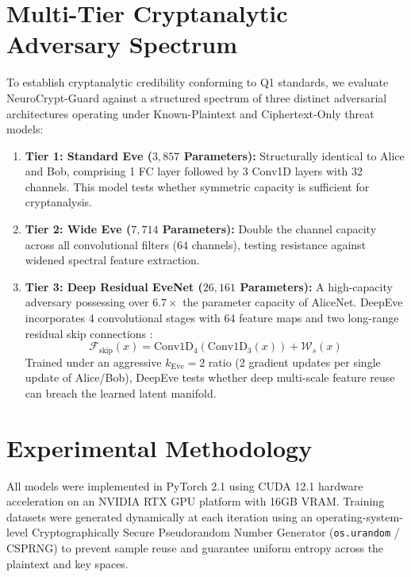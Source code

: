 \documentclass[journal,10pt,twocolumn]{IEEEtran}
\begin{document}
\section{Multi-Tier Cryptanalytic Adversary Spectrum}
To establish cryptanalytic credibility conforming to Q1 standards, we evaluate NeuroCrypt-Guard against a structured spectrum of three distinct adversarial architectures operating under Known-Plaintext and Ciphertext-Only threat models:
\begin{enumerate}
    \item \textbf{Tier 1: Standard Eve ($3,857$ Parameters):} Structurally identical to Alice and Bob, comprising 1 FC layer followed by 3 Conv1D layers with 32 channels. This model tests whether symmetric capacity is sufficient for cryptanalysis.
    \item \textbf{Tier 2: Wide Eve ($7,714$ Parameters):} Double the channel capacity across all convolutional filters ($64$ channels), testing resistance against widened spectral feature extraction.
    \item \textbf{Tier 3: Deep Residual EveNet ($26,161$ Parameters):} A high-capacity adversary possessing over $6.7\times$ the parameter capacity of AliceNet. DeepEve incorporates 4 convolutional stages with 64 feature maps and two long-range residual skip connections \cite{he2016deep}:
    \begin{equation}
        \mathcal{F}_{\text{skip}}(x) = \text{Conv1D}_4(\text{Conv1D}_3(x)) + \mathcal{W}_s(x)
    \end{equation}
    Trained under an aggressive $k_{\text{Eve}}=2$ ratio (2 gradient updates per single update of Alice/Bob), DeepEve tests whether deep multi-scale feature reuse can breach the learned latent manifold.
\end{enumerate}

\section{Experimental Methodology}
All models were implemented in PyTorch 2.1 using CUDA 12.1 hardware acceleration on an NVIDIA RTX GPU platform with 16GB VRAM. Training datasets were generated dynamically at each iteration using an operating-system-level Cryptographically Secure Pseudorandom Number Generator (\texttt{os.urandom} / CSPRNG) to prevent sample reuse and guarantee uniform entropy across the plaintext and key spaces.
\end{document}
